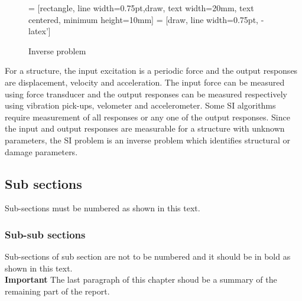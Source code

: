 \documentclass[MTech]{ugthesis}
\begin{document}
 \begin{figure}[htpb]
   \centering
      = [rectangle, line width=0.75pt,draw,  text width=20mm, text centered,  minimum height=10mm]
      = [draw, line width=0.75pt, -latex']
  \caption{Inverse problem}
  \label{fig:ip}
  \end{figure}
  For a structure, the input excitation is a periodic force and the output responses are displacement, velocity and acceleration. The input force can be measured using force transducer and the output responses can be measured respectively using vibration pick-ups, velometer and accelerometer. Some \ac{SI} algorithms require measurement of all responses or any one of the output responses. Since the input and output responses are measurable for a structure with unknown parameters, the \ac{SI} problem is an inverse problem which identifies structural or damage parameters.\\ \vspace{-5mm}
  \subsection{Sub sections} 
  Sub-sections must be numbered as shown in this text. 
  \subsubsection{Sub-sub sections}
  Sub-sections of sub section are not to be numbered and it should be in bold as shown in this text. \\
\textbf{Important}
The last paragraph of this chapter shoud be a summary of the remaining part of the report.

\end{document}
